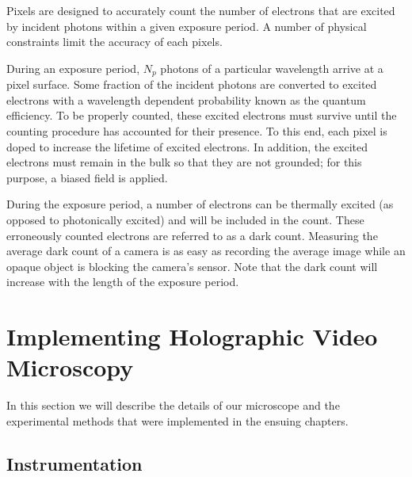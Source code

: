 Pixels are designed to accurately count the number of electrons that are
excited by incident photons within a given exposure period. A number of physical constraints
limit the accuracy of each pixels.

During an exposure period, $N_p$ photons of a particular wavelength arrive at a pixel
surface. Some fraction of the incident photons are converted to excited electrons
with a wavelength dependent probability known as the quantum efficiency. To be properly
counted, these excited electrons must survive until the counting procedure has
accounted for their presence. To this end, each pixel is doped to increase the lifetime
of excited electrons. In addition, the excited electrons must remain in the bulk so that
they are not grounded; for this purpose, a biased field is applied. %

During the exposure period, a number of electrons can be thermally excited (as opposed to
photonically excited) and will be included in the count. These erroneously
counted electrons are referred to as a dark count. Measuring the average dark count of a
camera is as easy as recording the average image while an opaque object is blocking the
camera's sensor. Note that the dark count will increase with the length of the exposure
period.




\section{Implementing Holographic Video Microscopy}

In this section we will describe the details of our microscope and
the experimental methods that were implemented in the ensuing chapters.



\subsection{Instrumentation}

